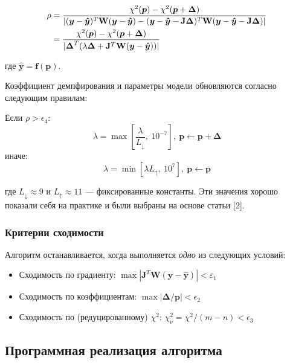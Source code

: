 \[
	\begin{aligned}
		\rho & = \frac{\chi^2(\boldsymbol p) - \chi^2(\boldsymbol p + \boldsymbol\Delta)}
		{|(\boldsymbol{y}-\boldsymbol{\hat{y}})^T\mathbf{W}(\boldsymbol{y}-\boldsymbol{\hat{y}}) - (\boldsymbol{y}-\boldsymbol{\hat{y}}-\mathbf{J}\boldsymbol{\Delta})^T\mathbf{W}(\boldsymbol{y}-\boldsymbol{\hat{y}}-\mathbf{J}\boldsymbol{\Delta})|} \notag \\
		     & =\frac{\chi^2(\boldsymbol p) - \chi^2(\boldsymbol p + \boldsymbol\Delta)}
		{|\boldsymbol{\Delta}^T(\lambda\boldsymbol{\Delta} + \mathbf{J}^T\mathbf{W}(\boldsymbol{y}-\boldsymbol{\hat{y}}))|}\notag                                                                                                                              \\
	\end{aligned}
\]

где $\boldsymbol{\hat{y}} = \mathbf{f}(\boldsymbol{p})$.

Коэффициент демпфирования и параметры модели обновляются согласно следующим правилам:

Если $\rho > \epsilon_4$:
\[
	\lambda = \max\left[\frac{\lambda}{L_\downarrow},\:10^{-7}\right],\:\mathbf{p} \gets \mathbf{p} + \boldsymbol{\Delta}
\]
иначе:
\[
	\lambda = \min\left[\lambda L_\uparrow,\:10^{7}\right],\:\mathbf{p} \gets \mathbf{p}
\]

где $L_\downarrow\approx 9$ и $L_\uparrow\approx 11$ — фиксированные константы. Эти значения хорошо показали себя на практике и были выбраны на основе статьи [2].

\subsubsection{Критерии сходимости}

Алгоритм останавливается, когда выполняется \textit{одно} из следующих условий:

\begin{itemize}
	\item Сходимость по градиенту: $\operatorname{max}|\mathbf{J}^T\mathbf{W}(\boldsymbol{y}-\boldsymbol{\hat{y}})| < \varepsilon_1$
	\item Сходимость по коэффициентам: $\operatorname{max}|{\boldsymbol{\Delta}}/\mathbf{p}| < \epsilon_2$
	\item Сходимость по (редуцированному) $\chi^2$: $\chi^2_{\nu}=\chi^2/(m-n) < \epsilon_3$
\end{itemize}

\subsection{Программная реализация алгоритма}

